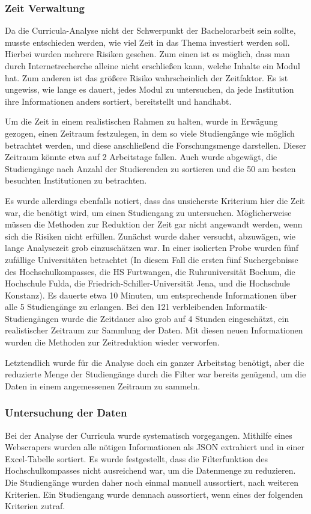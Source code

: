 \subsubsection{Zeit Verwaltung}\label{sec:time_management}
Da die Curricula-Analyse nicht der Schwerpunkt der Bachelorarbeit sein sollte, musste entschieden werden, wie viel Zeit in das Thema investiert werden soll.
Hierbei wurden mehrere Risiken gesehen. Zum einen ist es möglich, dass man durch Internetrecherche alleine nicht erschließen kann, welche Inhalte ein Modul hat.
Zum anderen ist das größere Risiko wahrscheinlich der Zeitfaktor. Es ist ungewiss, wie lange es dauert, jedes Modul zu untersuchen, da jede Institution ihre Informationen anders sortiert, bereitstellt und handhabt.

Um die Zeit in einem realistischen Rahmen zu halten, wurde in Erwägung gezogen, einen Zeitraum festzulegen, in dem so viele Studiengänge wie möglich betrachtet werden, und diese anschließend die Forschungsmenge darstellen. Dieser Zeitraum könnte etwa auf 2 Arbeitstage fallen. Auch wurde abgewägt, die Studiengänge nach Anzahl der Studierenden zu sortieren und die 50 am besten besuchten Institutionen zu betrachten.

Es wurde allerdings ebenfalls notiert, dass das unsicherste Kriterium hier die Zeit war, die benötigt wird, um einen Studiengang zu untersuchen. Möglicherweise müssen die Methoden zur Reduktion der Zeit gar nicht angewandt werden, wenn sich die Risiken nicht erfüllen. Zunächst wurde daher versucht, abzuwägen, wie lange Analysezeit grob einzuschätzen war.
In einer isolierten Probe wurden fünf zufällige Universitäten betrachtet (In diesem Fall die ersten fünf Suchergebnisse des Hochschulkompasses, die HS Furtwangen, die Ruhruniversität Bochum, die Hochschule Fulda, die Friedrich-Schiller-Universität Jena, und die Hochschule Konstanz).
Es dauerte etwa 10 Minuten, um entsprechende Informationen über alle 5 Studiengänge zu erlangen.
Bei den 121 verbleibenden Informatik-Studiengängen wurde die Zeitdauer also grob auf 4 Stunden eingeschätzt, ein realistischer Zeitraum zur Sammlung der Daten. Mit diesen neuen Informationen wurden die Methoden zur Zeitreduktion wieder verworfen.

Letztendlich wurde für die Analyse doch ein ganzer Arbeitstag benötigt, aber die reduzierte Menge der Studiengänge durch die Filter war bereits genügend, um die Daten in einem angemessenen Zeitraum zu sammeln.

\subsubsection{Untersuchung der Daten}\label{sec:sorting}
Bei der Analyse der Curricula wurde systematisch vorgegangen. Mithilfe eines Webscrapers wurden alle nötigen Informationen als JSON extrahiert und in einer Excel-Tabelle sortiert.
Es wurde festgestellt, dass die Filterfunktion des Hochschulkompasses nicht ausreichend war, um die Datenmenge zu reduzieren. Die Studiengänge wurden daher noch einmal manuell aussortiert, nach weiteren Kriterien.
Ein Studiengang wurde demnach aussortiert, wenn eines der folgenden Kriterien zutraf.

